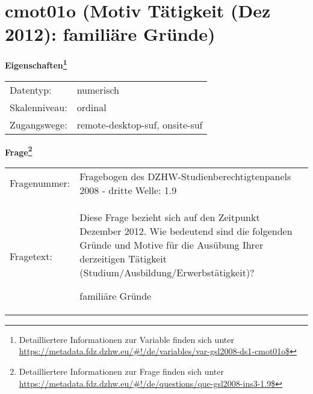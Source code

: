 
    \setcounter{footnote}{0}

    \vspace*{-1.8cm}
	\section{cmot01o (Motiv Tätigkeit (Dez 2012): familiäre Gründe)}
	\label{section:cmot01o}



    \vspace*{0.5cm}
    \noindent\textbf{Eigenschaften\footnote{Detailliertere Informationen zur Variable finden sich unter
		\url{https://metadata.fdz.dzhw.eu/\#!/de/variables/var-gsl2008-ds1-cmot01o$}}}\\
	\begin{tabularx}{\hsize}{@{}lX}
	Datentyp: & numerisch \\
	Skalenniveau: & ordinal \\
	Zugangswege: &
	  remote-desktop-suf, 
	  onsite-suf
 \\
    \end{tabularx}



				\vspace*{0.5cm}
                \noindent\textbf{Frage\footnote{Detailliertere Informationen zur Frage finden sich unter
		              \url{https://metadata.fdz.dzhw.eu/\#!/de/questions/que-gsl2008-ins3-1.9$}}}\\
				\begin{tabularx}{\hsize}{@{}lX}
					Fragenummer: &
					  Fragebogen des DZHW-Studienberechtigtenpanels 2008 - dritte Welle:
					  1.9
 \\
					Fragetext: & Diese Frage bezieht sich auf den Zeitpunkt Dezember 2012. Wie bedeutend sind die folgenden Gründe und Motive für die Ausübung Ihrer derzeitigen Tätigkeit (Studium/Ausbildung/Erwerbstätigkeit)?\par  familiäre Gründe \\
				\end{tabularx}





